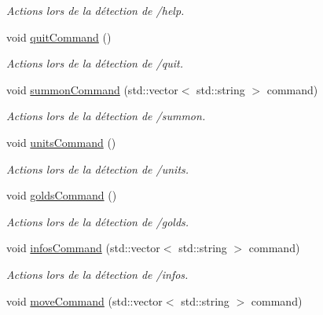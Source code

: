 \begin{DoxyCompactItemize}
\begin{DoxyCompactList}\small\item\em Actions lors de la détection de /help. \end{DoxyCompactList}\item 
\hypertarget{classGame_a2be014c3f87a1a6f9169ee0c3d002360}{void \hyperlink{classGame_a2be014c3f87a1a6f9169ee0c3d002360}{quit\+Command} ()}\label{classGame_a2be014c3f87a1a6f9169ee0c3d002360}

\begin{DoxyCompactList}\small\item\em Actions lors de la détection de /quit. \end{DoxyCompactList}\item 
\hypertarget{classGame_a762c24a729cfdc357acbd5c6ecc4c4f8}{void \hyperlink{classGame_a762c24a729cfdc357acbd5c6ecc4c4f8}{summon\+Command} (std\+::vector$<$ std\+::string $>$ command)}\label{classGame_a762c24a729cfdc357acbd5c6ecc4c4f8}

\begin{DoxyCompactList}\small\item\em Actions lors de la détection de /summon. \end{DoxyCompactList}\item 
\hypertarget{classGame_af22614489ceb0cf9a0081016314c75df}{void \hyperlink{classGame_af22614489ceb0cf9a0081016314c75df}{units\+Command} ()}\label{classGame_af22614489ceb0cf9a0081016314c75df}

\begin{DoxyCompactList}\small\item\em Actions lors de la détection de /units. \end{DoxyCompactList}\item 
\hypertarget{classGame_a470d2a7a0da91c8287276d6135840dfd}{void \hyperlink{classGame_a470d2a7a0da91c8287276d6135840dfd}{golds\+Command} ()}\label{classGame_a470d2a7a0da91c8287276d6135840dfd}

\begin{DoxyCompactList}\small\item\em Actions lors de la détection de /golds. \end{DoxyCompactList}\item 
\hypertarget{classGame_acea1269edf0a00ada8e765e385ab5df1}{void \hyperlink{classGame_acea1269edf0a00ada8e765e385ab5df1}{infos\+Command} (std\+::vector$<$ std\+::string $>$ command)}\label{classGame_acea1269edf0a00ada8e765e385ab5df1}

\begin{DoxyCompactList}\small\item\em Actions lors de la détection de /infos. \end{DoxyCompactList}\item 
\hypertarget{classGame_a3b1e53d7df15b62d651830bbd47a7516}{void \hyperlink{classGame_a3b1e53d7df15b62d651830bbd47a7516}{move\+Command} (std\+::vector$<$ std\+::string $>$ command)}\label{classGame_a3b1e53d7df15b62d651830bbd47a7516}


\end{DoxyCompactItemize}
